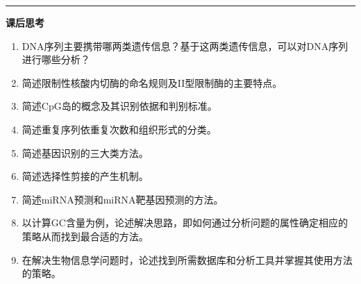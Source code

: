 \documentclass[11pt,a4paper,twoside]{book}
\begin{document}
\vspace{1cm}
\hrule height 3pt

\noindent
{\Large \bfseries \Coffeecup 课后思考}
\begin{enumerate}
  \item DNA序列主要携带哪两类遗传信息？基于这两类遗传信息，可以对DNA序列进行哪些分析？
  \item 简述限制性核酸内切酶的命名规则及II型限制酶的主要特点。
  \item 简述CpG岛的概念及其识别依据和判别标准。
  \item 简述重复序列依重复次数和组织形式的分类。
  \item 简述基因识别的三大类方法。
  \item 简述选择性剪接的产生机制。
  \item 简述miRNA预测和miRNA靶基因预测的方法。
  \item 以计算GC含量为例，论述解决思路，即如何通过分析问题的属性确定相应的策略从而找到最合适的方法。
  \item 在解决生物信息学问题时，论述找到所需数据库和分析工具并掌握其使用方法的策略。
\end{enumerate}
\end{document}
